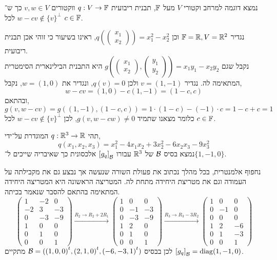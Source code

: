 \question{}
נמצא דוגמה למרחב וקטורי $V$ מעל $\mathbb{F}$, תבנית ריבועית $q : V \to \mathbb{F}$ ווקטורים $v, w \in V$ כך ש־$w - c v \notin {\{ v \}}^\perp$ לכל $c \in \mathbb{F}$.
\begin{solution}
	נגדיר $\mathbb{F} = \mathbb{R}, V = \mathbb{R}^2$ וכן $q(\begin{pmatrix} x_1 \\ x_2 \end{pmatrix}) = x_1^2 - x_2^2$, ראינו בשיעור כי זוהי אכן תבנית ריבועית. \\
	נקבל שגם $g(\begin{pmatrix} x_1 \\ x_2 \end{pmatrix}, \begin{pmatrix} y_1 \\ y_2 \end{pmatrix}) = x_1 y_1 - x_2 y_2$ היא התבנית הבילינארית הסימטרית המתאימה לה.
	נגדיר $v = (1, -1)$ ולכן $q(v) = 0$, ונגדיר את $w = (1, 0)$, נקבל,
	\[
		w - c v
		= (1, 0) - c (1, -1)
		= (1 - c, c)
	\]
	ובהתאם,
	\[
		g(v, w - c v)
		= g((1, -1), (1 - c, c))
		= 1 \cdot (1 - c) - (-1) \cdot c
		= 1 - c + c
		= 1
	\]
	כלומר מצאנו שתמיד $g(v, w - c w) \ne 0$, לכן $w - c v \notin {\{ v \}}^\perp$ לכל $c \in \mathbb{F}$.
\end{solution}

\question{}
תהי $q : \mathbb{R}^3 \to \mathbb{R}$ המוגדרת על־ידי,
\[
	q(x_1, x_2, x_3)
	= x_1^2 - 4 x_1 x_2 + 3 x_2^2 - 6 x_2 x_3 - 9 x_3^2
\]
נמצא בסיס $\mathcal{B}$ של $\mathbb{R}^3$ עבורו ${[g_q]}_{\mathcal{B}}$ אלכסונית כך שאיבריה שייכים ל־$\{1, -1, 0\}$.
\begin{solution}
	נחפוף אלמנטרית, בכל מהלך נכתוב את פעולת השורה שנעשה אך נבצע גם את מקבילתה על העמודה וגם את מטריצת היחידה מתחת לה.
	המטריצה הראשונה היא המטריצה היחידה המתאימה בהתאם להסבר שנאמר בכיתה.
	\[
		\begin{pmatrix}
			1 & -2 & 0 \\
			-2 & 3 & -3 \\
			0 & -3 & -9 \\
			\hline
			1 & 0 & 0 \\
			0 & 1 & 0 \\
			0 & 0 & 1
		\end{pmatrix}
		\xrightarrow{R_2 \to R_2 + 2 R_1}
		\begin{pmatrix}
			1 & 0 & 0 \\
			0 & -1 & -3 \\
			0 & -3 & -9 \\
			\hline
			1 & 2 & 0 \\
			0 & 1 & 0 \\
			0 & 0 & 1
		\end{pmatrix}
		\xrightarrow{R_3 \to R_3 - 3 R_2}
		\begin{pmatrix}
			1 & 0 & 0 \\
			0 & -1 & 0 \\
			0 & 0 & 0 \\
			\hline
			1 & 2 & -6 \\
			0 & 1 & -3 \\
			0 & 0 & 1
		\end{pmatrix}
	\]
	לכן בבסיס $\mathcal{B} = ({(1, 0, 0)}^t, {(2, 1, 0)}^t, {(-6, -3, 1)}^t)$ מתקיים ${[g_q]}_{\mathcal{B}} = \operatorname{diag}(1, -1, 0)$.
\end{solution}

